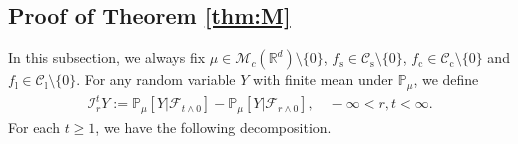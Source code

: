 \documentclass[12pt,a4paper]{amsart}
\theoremstyle{plain}
\theoremstyle{definition}
\numberwithin{equation}{section}
\begin{document}
\subsection{Proof of Theorem \ref{thm:M}}
\label{sec: main}
In this subsection, we always fix $\mu \in \mathcal M_c(\mathbb R^d)\setminus\{0\}$, $f_\mathrm s\in \mathcal C_\mathrm s\setminus\{0\}$,  $f_\mathrm c\in \mathcal C_\mathrm c\setminus\{0\}$ and $f_\mathrm l\in \mathcal C_\mathrm l\setminus\{0\}$.
	 For any random variable $Y$ with finite mean under $\mathbb P_\mu$, we define 
\begin{align}
	\mathcal I_r^t Y := \mathbb P_\mu[Y|\mathscr F_{t\wedge 0}] - \mathbb P_\mu[Y|\mathscr F_{r\wedge 0}], \quad -\infty < r, t <\infty.
\end{align}
	For each $t\geq 1$,
	we have the following decomposition.
\end{document}
